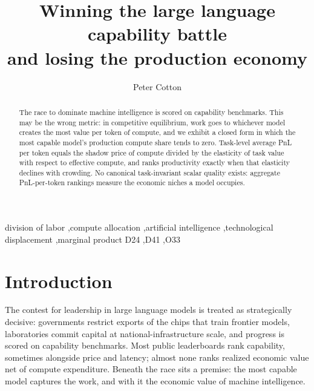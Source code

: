 \documentclass[preprint,11pt,authoryear]{elsarticle}
\begin{document}
\begin{frontmatter}

\title{Winning the large language capability battle\\ and losing the production economy}

\author{Peter Cotton}
\address{Global Strategic Minerals Corporation}

\begin{abstract}
The race to dominate machine intelligence is scored on capability benchmarks. This may be the wrong metric: in competitive equilibrium, work goes to whichever model creates the most value per token of compute, and we exhibit a closed form in which the most capable model's production compute share tends to zero. Task-level average PnL per token equals the shadow price of compute divided by the elasticity of task value with respect to effective compute, and ranks productivity exactly when that elasticity declines with crowding. No canonical task-invariant scalar quality exists: aggregate PnL-per-token rankings measure the economic niches a model occupies.
\end{abstract}

\begin{keyword}
division of labor \sep compute allocation \sep artificial intelligence \sep technological displacement \sep marginal product
\JEL D24 \sep D41 \sep O33
\end{keyword}

\end{frontmatter}

\section{Introduction}

The contest for leadership in large language models is treated as strategically decisive: governments restrict exports of the chips that train frontier models, laboratories commit capital at national-infrastructure scale, and progress is scored on capability benchmarks. Most public leaderboards rank capability, sometimes alongside price and latency; almost none ranks realized economic value net of compute expenditure. Beneath the race sits a premise: the most capable model captures the work, and with it the economic value of machine intelligence.
\end{document}
